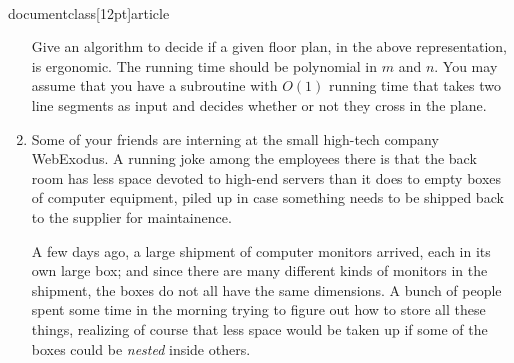 \\documentclass[12pt]{article}
\begin{document}
\begin{enumerate}
Give an algorithm to decide if a given floor plan,
in the above representation, is ergonomic.
The running time should be polynomial in $m$ and $n$.
You may assume that you have a subroutine with $O(1)$ running time
that takes two line segments as input and decides whether
or not they cross in the plane.




\item 

Some of your friends are interning at the small high-tech company WebExodus.
A running joke among the employees there is that the back room
has less space devoted to high-end servers than it does to
empty boxes of computer equipment, piled up in case something
needs to be shipped back to the supplier for maintainence.

A few days ago, a large shipment of computer monitors
arrived, each in its own large box;
and since there are many different kinds of monitors
in the shipment, the boxes do not all have the same dimensions.
A bunch of people spent some time in the morning
trying to figure out how to store all these things,
realizing of course that less space would be taken up if
some of the boxes could be {\em nested} inside others.


\end{enumerate}
\end{document}

